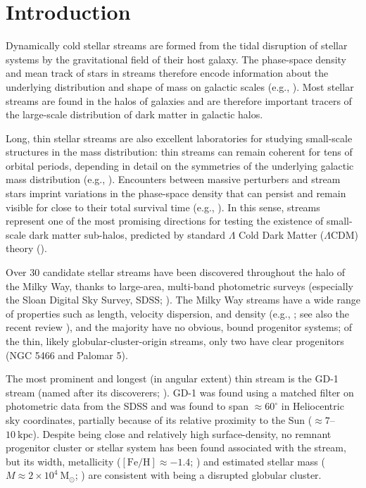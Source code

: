 \documentclass[modern]{aastex62}
\newcommand{\msun}{\textrm{M}_\odot}
\newcommand{\feh}{\ensuremath{[\textrm{Fe} / \textrm{H}]}}
\begin{document}

\section{Introduction}
\label{sec:intro}

Dynamically cold stellar streams are formed from the tidal disruption of stellar
systems by the gravitational field of their host galaxy.
The phase-space density and mean track of stars in streams therefore encode
information about the underlying distribution and shape of mass on galactic
scales (e.g., \citealt{Johnston:1999, Bonaca:2018}).
Most stellar streams are found in the halos of galaxies and are therefore
important tracers of the large-scale distribution of dark matter in galactic
halos.

Long, thin stellar streams are also excellent laboratories for studying
small-scale structures in the mass distribution:
thin streams can remain coherent for tens of orbital periods, depending in
detail on the symmetries of the underlying galactic mass distribution (e.g.,
\citealt{Erkal:2016a}).
Encounters between massive perturbers and stream stars imprint variations in the
phase-space density that can persist and remain visible for close to their total
survival time (e.g., \citealt{Yoon:2011}).
In this sense, streams represent one of the most promising directions for
testing the existence of small-scale dark matter sub-halos, predicted by
standard $\Lambda$ Cold Dark Matter ($\Lambda$CDM) theory
(\citealt{Erkal:2015, Sanders:2016, Bovy:2017}).

Over 30 candidate stellar streams have been discovered throughout the halo of
the Milky Way, thanks to large-area, multi-band photometric surveys (especially
the Sloan Digital Sky Survey, SDSS; \citealt{York:2000}).
The Milky Way streams have a wide range of properties such as length, velocity
dispersion, and density (e.g., \citealt{Odenkirchen:2001, Grillmair:2006,
Grillmair:2006b, Belokurov:2006, Belokurov:2007, Bonaca:2012, Shipp:2018}; see
also the recent review \citealt{Grillmair:2016, Newberg:2016}), and the majority
have no obvious, bound progenitor systems;
of the thin, likely globular-cluster-origin streams, only two have clear
progenitors (NGC 5466 and Palomar 5).

The most prominent and longest (in angular extent) thin stream is the GD-1
stream (named after its discoverers; \citealt{Grillmair:2006}).
GD-1 was found using a matched filter on photometric data from the SDSS and
was found to span $\approx 60^\circ$ in Heliocentric sky coordinates, partially
because of its relative proximity to the Sun ($\approx 7$--$10~\textrm{kpc}$).
Despite being close and relatively high surface-density, no remnant progenitor
cluster or stellar system has been found associated with the stream, but its
width,  metallicity ($\feh \approx -1.4$; \citealt{Koposov:2010}) and estimated
stellar mass ($M \approx 2 \times 10^4~\msun$; \citealt{Koposov:2010}) are
consistent with being a disrupted globular cluster.
\end{document}

